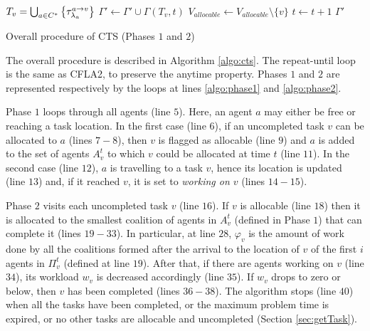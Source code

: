 \begin{algorithm}
{{{{{                    }
                }
                $T_v = \bigcup_{a \in C^*} \left\{ \tau^{a \rightarrow v}_{\lambda_a} \right\}$
                \;
                $\Gamma' \gets \Gamma' \cup \Gamma(T_v, t)$
                \;
                $V_{allocable} \gets V_{allocable} \setminus \{v\}$\;
            }
        }
        $t \gets t + 1$\;
    }
    \Return $\Gamma'$\;
    \caption{Overall procedure of \textsf{CTS} (Phases $1$ and $2$)\label{algo:cts}}
\end{algorithm}

The overall procedure is described in Algorithm \ref{algo:cts}. The \textsf{repeat-until}
loop is the same as CFLA2, to preserve the anytime property. Phases $1$ and $2$ are
represented respectively by the loops at lines \ref{algo:phase1} and \ref{algo:phase2}.

Phase $1$ loops through all agents (line $5$). Here, an agent $a$ may either be free or
reaching a task location. In the first case (line $6$), if an uncompleted task $v$ can be
allocated to $a$ (lines $7 - 8$), then $v$ is flagged as allocable (line $9$) and $a$ is
added to the set of agents $A^t_v$ to which $v$ could be allocated at time $t$ (line
$11$). In the second case (line $12$), $a$ is travelling to a task $v$, hence its location
is updated (line $13$) and, if it reached $v$, it is set to \emph{working on $v$} (lines
$14 - 15$).

Phase $2$ visits each uncompleted task $v$ (line $16$). If $v$ is allocable (line $18$)
then it is allocated to the smallest coalition of agents in $A^t_v$ (defined in Phase $1$)
that can complete it (lines $19 - 33$). In particular, at line $28$, $\varphi_v$ is the
amount of work done by all the coalitions formed after the arrival to the location of $v$
of the first $i$ agents in $\Pi_v^t$ (defined at line $19$).
After that, if there are agents working on $v$ (line $34$), its workload $w_v$ is
decreased accordingly (line $35$). If $w_v$ drops to zero or below, then $v$ has been
completed (lines $36 - 38$). The algorithm stops (line $40$) when all the tasks have been
completed, or the maximum problem time is expired, or no other tasks are allocable and
uncompleted (Section \ref{sec:getTask}).
\clearpage

